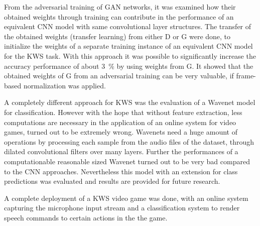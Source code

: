 From the adversarial training of GAN networks, it was examined how their obtained weights through training can contribute in the performance of an equivalent CNN model with same convolutional layer structures.
The transfer of the obtained weights (transfer learning) from either D or G were done, to initialize the weights of a separate training instance of an equivalent CNN model for the KWS task.
With this approach it was possible to significantly increase the accuracy performance of about \SI{3}{\percent} by using weights from G.
It showed that the obtained weights of G from an adversarial training can be very valuable, if frame-based normalization was applied.

A completely different approach for KWS was the evaluation of a Wavenet \cite{Oord2016} model for classification.
However with the hope that without feature extraction, less computations are necessary in the application of an online system for video games, turned out to be extremely wrong.
Wavenets need a huge amount of operations by processing each sample from the audio files of the dataset, through dilated convolutional filters over many layers.
Further the performances of a computationable reasonable sized Wavenet turned out to be very bad compared to the CNN approaches.
Nevertheless this model with an extension for class predictions was evaluated and results are provided for future research.

A complete deployment of a KWS video game was done, with an online system capturing the microphone input stream and a classification system to render speech commands to certain actions in the the game.